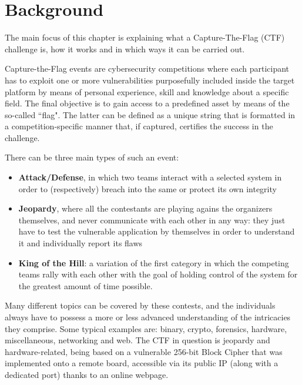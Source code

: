 \chapter{Background}
\label{Chapter2}
The main focus of this chapter is explaining what a Capture-The-Flag (CTF) challenge is, how it works and in which ways it can be carried out.

Capture-the-Flag events are cybersecurity competitions where each participant has to exploit one or more vulnerabilities purposefully included inside the target platform by means of personal experience, skill and knowledge about a specific field.
The final objective is to gain access to a predefined asset by means of the so-called ``flag". The latter can be defined as a unique string that is formatted in a competition-specific manner that, if captured, certifies the success in the challenge.

There can be three main types of such an event:
\begin{itemize}
    \item \textbf{Attack/Defense}, in which two teams interact with a selected system in order to (respectively) breach into the same or protect its own integrity
    \item \textbf{Jeopardy}, where all the contestants are playing agains the organizers themselves, and never communicate with each other in any way: they just have to test the vulnerable application by themselves in order to understand it and individually report its flaws
    \item \textbf{King of the Hill}: a variation of the first category in which the competing teams rally with each other with the goal of holding control of the system for the greatest amount of time possible.
\end{itemize}

Many different topics can be covered by these contests, and the individuals always have to possess a more or less advanced understanding of the intricacies they comprise. Some typical examples are: binary, crypto, forensics, hardware, miscellaneous, networking and web.
The CTF in question is jeopardy and hardware-related, being based on a vulnerable 256-bit Block Cipher that was implemented onto a remote board, accessible via its public IP (along with a dedicated port) thanks to an online webpage.